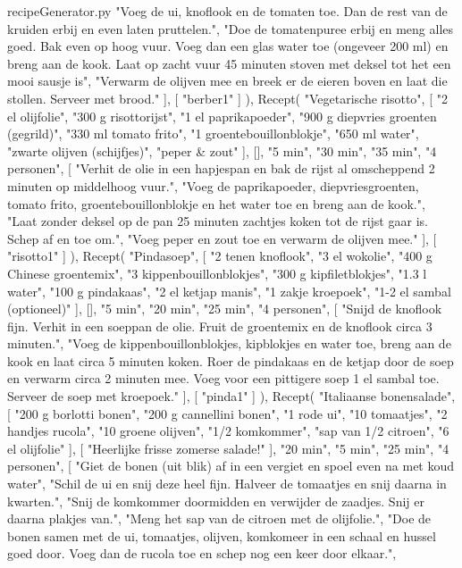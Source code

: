 \begin{filecontents*}{recipeGenerator.py}
		"Voeg de ui, knoflook en de tomaten toe. Dan de rest van de kruiden erbij en even laten pruttelen.",
		"Doe de tomatenpuree erbij en meng alles goed. Bak even op hoog vuur. Voeg dan een glas water toe (ongeveer 200 ml) en breng aan de kook. Laat op zacht vuur 45 minuten stoven met deksel tot het een mooi sausje is",
		"Verwarm de olijven mee en breek er de eieren boven en laat die stollen. Serveer met brood."
	],
	[
		"berber1"
	]
),
Recept(
	"Vegetarische risotto",
	[
		"2 el olijfolie",
		"300 g risottorijst",
		"1 el paprikapoeder",
		"900 g diepvries groenten (gegrild)",
		"330 ml tomato frito",
		"1 groentebouillonblokje",
		"650 ml water",
		"zwarte olijven (schijfjes)",
		"peper \& zout"
	],
	[],
	"5 min",
	"30 min",
	"35 min",
	"4 personen",
	[
		"Verhit de olie in een hapjespan en bak de rijst al omscheppend 2 minuten op middelhoog vuur.",
		"Voeg de paprikapoeder, diepvriesgroenten, tomato frito, groentebouillonblokje en het water toe en breng aan de kook.",
		"Laat zonder deksel op de pan 25 minuten zachtjes koken tot de rijst gaar is. Schep af en toe om.",
		"Voeg peper en zout toe en verwarm de olijven mee."
	],
	[
		"risotto1"
	]
),
Recept(
	"Pindasoep",
	[
		"2 tenen knoflook",
		"3 el wokolie",
		"400 g Chinese groentemix",
		"3 kippenbouillonblokjes",
		"300 g kipfiletblokjes",
		"1.3 l water",
		"100 g pindakaas",
		"2 el ketjap manis",
		"1 zakje kroepoek",
		"1-2 el sambal (optioneel)"
	],
	[],
	"5 min",
	"20 min",
	"25 min",
	"4 personen",
	[
		"Snijd de knoflook fijn. Verhit in een soeppan de olie. Fruit de groentemix en de knoflook circa 3 minuten.",
		"Voeg de kippenbouillonblokjes, kipblokjes en water toe, breng aan de kook en laat circa 5 minuten koken. Roer de pindakaas en de ketjap door de soep en verwarm circa 2 minuten mee. Voeg voor een pittigere soep 1 el sambal toe. Serveer de soep met kroepoek."
	],
	[
		"pinda1"
	]
),
Recept(
	"Italiaanse bonensalade",
	[
		"200 g borlotti bonen",
		"200 g cannellini bonen",
		"1 rode ui",
		"10 tomaatjes",
		"2 handjes rucola",
		"10 groene olijven",
		"1/2 komkommer",
		"sap van 1/2 citroen",
		"6 el olijfolie"
	],
	[
		"Heerlijke frisse zomerse salade!"
	],
	"20 min",
	"5 min",
	"25 min",
	"4 personen",
	[
		"Giet de bonen (uit blik) af in een vergiet en spoel even na met koud water",
		"Schil de ui en snij deze heel fijn. Halveer de tomaatjes en snij daarna in kwarten.",
		"Snij de komkommer doormidden en verwijder de zaadjes. Snij er daarna plakjes van.",
		"Meng het sap van de citroen met de olijfolie.",
		"Doe de bonen samen met de ui, tomaatjes, olijven, komkomeer in een schaal en hussel goed door. Voeg dan de rucola toe en schep nog een keer door elkaar.",

\end{filecontents*}
